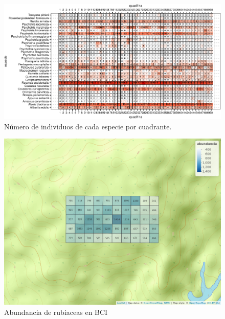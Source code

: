 \documentclass[11pt,]{article}
\begin{document}
\begin{figure}
\centering
\includegraphics{manuscrito_files/figure-latex/unnamed-chunk-3-1.pdf}
\caption{\label{fig:abun_sp_q}Número de individuos de cada especie por
cuadrante.}
\end{figure}

\begin{figure}
\centering
\includegraphics{mapa_cuadros_abun_rubic.png}
\caption{Abundancia de rubiaceas en BCI
\label{fig:mapa_cuadros_abun_rubic}}
\end{figure}
\end{document}
